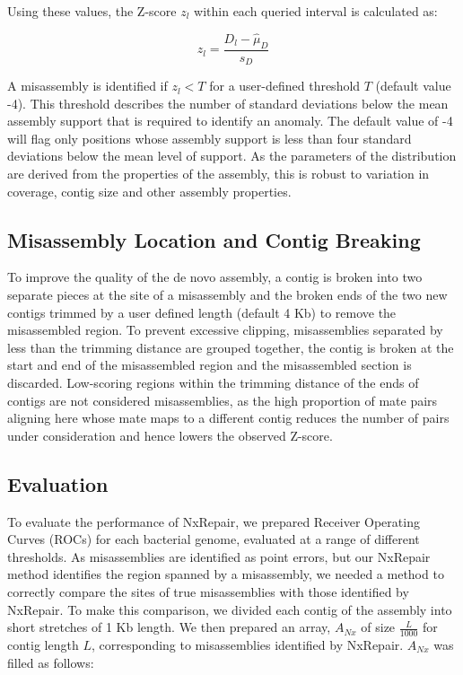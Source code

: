 \documentclass[12pt]{article}
\begin{document}
Using these values, the Z-score $z_l$ within each queried interval is calculated as: 

\begin{equation}
z_l = \frac{D_l - \hat{\mu}_D}{s_D}
\label{eq:zscore}
\end{equation}

A misassembly is identified if $z_l < T$ for a user-defined threshold $T$ (default value -4). This threshold describes the number of standard deviations below the mean assembly support that is required to identify an anomaly. The default value of -4 will flag only positions whose assembly support is less than four standard deviations below the mean level of support. As the parameters of the distribution are derived from the properties of the assembly, this is robust to variation in coverage, contig size and other assembly properties.

\subsection{Misassembly Location and Contig Breaking}
To improve the quality of the de novo assembly, a contig is broken into two separate pieces at the site of a misassembly and the broken ends of the two new contigs trimmed by a user defined length (default 4 Kb) to remove the misassembled region. To prevent excessive clipping, misassemblies separated by less than the trimming distance are grouped together, the contig is broken at the start and end of the misassembled region and the misassembled section is discarded. Low-scoring regions within the trimming distance of the ends of contigs are not considered misassemblies, as the high proportion of mate pairs aligning here whose mate maps to a different contig reduces the number of pairs under consideration and hence lowers the observed Z-score.   

\subsection{Evaluation}
To evaluate the performance of NxRepair, we prepared Receiver Operating Curves (ROCs) for each bacterial genome, evaluated at a range of different thresholds. As misassemblies are identified as point errors, but our NxRepair method identifies the region spanned by a misassembly, we needed a method to correctly compare the sites of true misassemblies with those identified by NxRepair. To make this comparison, we divided each contig of the assembly into short stretches of 1 Kb length. We then prepared an array, $A_{Nx}$ of size $\frac{L}{1000}$ for contig length $L$, corresponding to misassemblies identified by NxRepair. $A_{Nx}$ was filled as follows:
\end{document}

